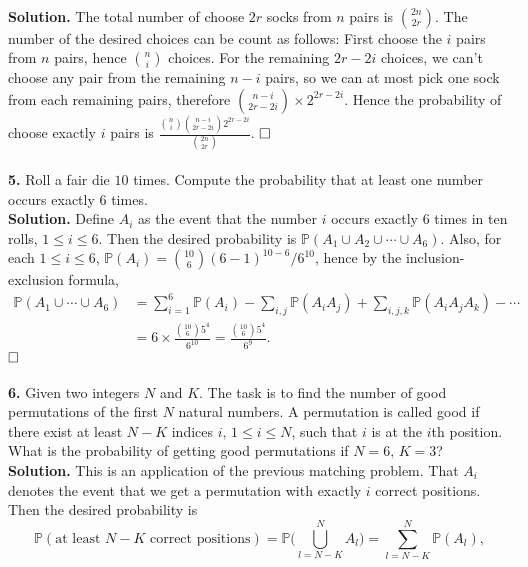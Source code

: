 \documentclass[12pt]{article}
\begin{document}
\\
\textbf{Solution.} The total number of choose $2r$ socks from $n$ pairs is $\binom{2n}{2r}$. The number of the desired choices can be count as follows: First choose the $i$ pairs from $n$ pairs, hence $\binom{n}{i}$ choices. For the remaining $2r-2i$ choices, we can't choose any pair from the remaining $n-i$ pairs, so we can at most pick one sock from each remaining pairs, therefore $\binom{n-i}{2r-2i}\times 2^{2r-2i}$. Hence the probability of choose exactly $i$ pairs is $\frac{\binom{n}{i}\binom{n-i}{2r-2i} 2^{2r-2i}}{\binom{2n}{2r}}$.
$\hspace{\fill}\square$
\\ \\
\textbf{5.} Roll a fair die $10$ times. Compute the probability that at least one number occurs
exactly $6$ times.
\\
\textbf{Solution.} Define $A_i$ as the event that the number $i$ occurs exactly $6$ times in ten rolls, $1\leq i\leq 6$. Then the desired probability is $\mathbb{P}(A_1\cup A_2\cup\cdots\cup A_6)$. Also, for each $1\leq i\leq 6$, $\mathbb{P}(A_i)=\binom{10}{6}(6-1)^{10-6}/6^{10}$, hence by the inclusion-exclusion formula,
\begin{equation*}
\begin{aligned}
\mathbb{P}(A_1\cup\cdots\cup A_6)&=\sum_{i=1}^6\mathbb{P}(A_i)-\sum_{i,j}\mathbb{P}(A_iA_j)+\sum_{i,j,k}\mathbb{P}(A_iA_jA_k)-\cdots \\&
=6\times\frac{\binom{10}{6}5^4}{6^{10}}=\frac{\binom{10}{6}5^4}{6^{9}}.
\end{aligned}
\end{equation*}
$\hspace{\fill}\square$
\\ \\
\textbf{6.} Given two integers $N$ and $K$. The task is to find the number of good permutations of the first $N$ natural numbers. A permutation is called good if there exist at least $N-K$ indices $i,\,1\leq i\leq N$, such that $i$ is at the $i$th position. What is the probability of getting good permutations if $N= 6,\, K=3$?
\\
\textbf{Solution.} This is an application of the previous matching problem. That $A_i$ denotes the event that we get a permutation with exactly $i$ correct positions. Then the desired probability is
\begin{equation*}
\mathbb{P}(\text{at least $N-K$ correct positions})=\mathbb{P}\Big(\bigcup_{l=N-K}^NA_{l}\Big)=\sum_{l=N-K}^N\mathbb{P}(A_l),
\end{equation*}
\end{document}
